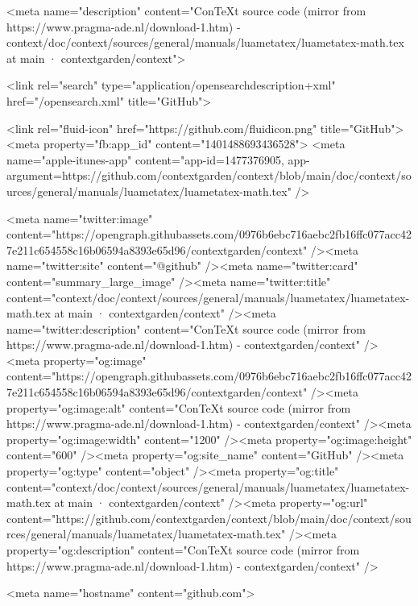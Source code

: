     

      <meta name="description" content="ConTeXt source code (mirror from https://www.pragma-ade.nl/download-1.htm) - context/doc/context/sources/general/manuals/luametatex/luametatex-math.tex at main · contextgarden/context">

      <link rel="search" type="application/opensearchdescription+xml" href="/opensearch.xml" title="GitHub">

    <link rel="fluid-icon" href="https://github.com/fluidicon.png" title="GitHub">
    <meta property="fb:app_id" content="1401488693436528">
    <meta name="apple-itunes-app" content="app-id=1477376905, app-argument=https://github.com/contextgarden/context/blob/main/doc/context/sources/general/manuals/luametatex/luametatex-math.tex" />

      <meta name="twitter:image" content="https://opengraph.githubassets.com/0976b6ebc716aebc2fb16ffc077acc427e211c654558c16b06594a8393e65d96/contextgarden/context" /><meta name="twitter:site" content="@github" /><meta name="twitter:card" content="summary_large_image" /><meta name="twitter:title" content="context/doc/context/sources/general/manuals/luametatex/luametatex-math.tex at main · contextgarden/context" /><meta name="twitter:description" content="ConTeXt source code (mirror from https://www.pragma-ade.nl/download-1.htm) - contextgarden/context" />
  <meta property="og:image" content="https://opengraph.githubassets.com/0976b6ebc716aebc2fb16ffc077acc427e211c654558c16b06594a8393e65d96/contextgarden/context" /><meta property="og:image:alt" content="ConTeXt source code (mirror from https://www.pragma-ade.nl/download-1.htm) - contextgarden/context" /><meta property="og:image:width" content="1200" /><meta property="og:image:height" content="600" /><meta property="og:site_name" content="GitHub" /><meta property="og:type" content="object" /><meta property="og:title" content="context/doc/context/sources/general/manuals/luametatex/luametatex-math.tex at main · contextgarden/context" /><meta property="og:url" content="https://github.com/contextgarden/context/blob/main/doc/context/sources/general/manuals/luametatex/luametatex-math.tex" /><meta property="og:description" content="ConTeXt source code (mirror from https://www.pragma-ade.nl/download-1.htm) - contextgarden/context" />
  




      <meta name="hostname" content="github.com">



